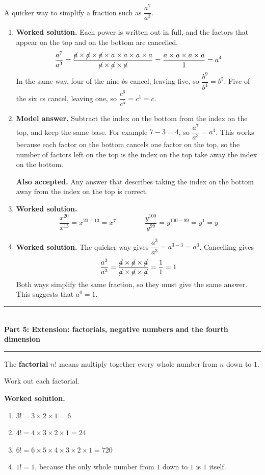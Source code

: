 \documentclass[12pt,a4paper]{article}
\newcommand{\heading}[1]{%
  \vspace{2pt}
  {\color{blue!45!black}\rule{\linewidth}{1pt}}\\[1pt]
  {\large\bfseries #1}\\[-6pt]
  {\color{blue!45!black}\rule{\linewidth}{0.4pt}}
  \vspace{2pt}}
\newcommand{\parttitle}[2]{\heading{Part #1: #2}}
\newcommand{\qhead}[2]{\par\addvspace{9pt}%
  \noindent{\bfseries Q#1.}\enspace #2\par\nobreak}
\newcommand{\wsol}{\par\smallskip
  \noindent\textbf{\color{blue!50!black}Worked solution.}\space}
\newcommand{\modelans}{\par\smallskip
  \noindent\textbf{\color{blue!50!black}Model answer.}\space}
\newcommand{\alsoacc}{\par\smallskip
  \noindent\textbf{\color{blue!50!black}Also accepted.}\space}
\begin{document}
\qhead{9}{A quicker way to simplify a fraction such as $\dfrac{a^7}{a^3}$.}
\begin{enumerate}
\item
\wsol
Each power is written out in full, and the factors that appear on the top and
on the bottom are cancelled.
\[\frac{a^7}{a^3}
  =\frac{\cancel{a}\times\cancel{a}\times\cancel{a}\times a\times a\times a\times a}
   {\cancel{a}\times\cancel{a}\times\cancel{a}}
  =\frac{a\times a\times a\times a}{1}=a^4\]
In the same way, four of the nine $b$s cancel, leaving five, so
$\dfrac{b^9}{b^4}=b^5$. Five of the six $c$s cancel, leaving one, so
$\dfrac{c^6}{c^5}=c^1=c$.

\item
\modelans
Subtract the index on the bottom from the index on the top, and keep the same
base. For example $7-3=4$, so $\dfrac{a^7}{a^3}=a^4$. This works because each
factor on the bottom cancels one factor on the top, so the number of factors
left on the top is the index on the top take away the index on the bottom.
\alsoacc
Any answer that describes taking the index on the bottom away from the index on
the top is correct.

\item
\wsol
\[\frac{x^{20}}{x^{13}}=x^{20-13}=x^7\qquad\qquad
  \frac{y^{100}}{y^{99}}=y^{100-99}=y^1=y\]

\item
\wsol
The quicker way gives $\dfrac{a^3}{a^3}=a^{3-3}=a^0$. Cancelling gives
\[\frac{a^3}{a^3}
  =\frac{\cancel{a}\times\cancel{a}\times\cancel{a}}
   {\cancel{a}\times\cancel{a}\times\cancel{a}}=\frac{1}{1}=1\]
Both ways simplify the same fraction, so they must give the same answer. This
suggests that $a^0=1$.
\end{enumerate}

\newpage

\parttitle{5}{Extension: factorials, negative numbers and the fourth dimension}

The \textbf{factorial} $n!$ means multiply together every whole number from $n$
down to $1$.

\qhead{10}{Work out each factorial.}
\wsol
\begin{enumerate}
\item $3!=3\times2\times1=6$
\item $4!=4\times3\times2\times1=24$
\item $6!=6\times5\times4\times3\times2\times1=720$
\item $1!=1$, because the only whole number from $1$ down to $1$ is $1$ itself.
\end{enumerate}
\end{document}

